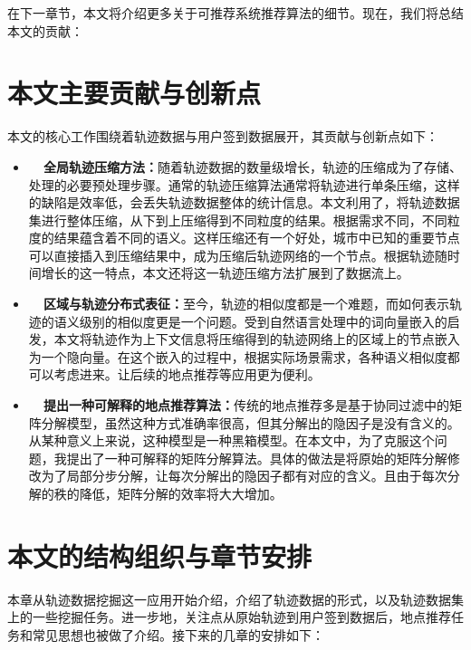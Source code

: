 在下一章节，本文将介绍更多关于可推荐系统推荐算法的细节。现在，我们将总结本文的贡献：

\section{本文主要贡献与创新点}
本文的核心工作围绕着轨迹数据与用户签到数据展开，其贡献与创新点如下：
\begin{itemize}
  \item \textbf{~~全局轨迹压缩方法：}随着轨迹数据的数量级增长，轨迹的压缩成为了存储、处理的必要预处理步骤。通常的轨迹压缩算法通常将轨迹进行单条压缩，这样的缺陷是效率低，会丢失轨迹数据整体的统计信息。本文利用了，将轨迹数据集进行整体压缩，从下到上压缩得到不同粒度的结果。根据需求不同，不同粒度的结果蕴含着不同的语义。这样压缩还有一个好处，城市中已知的重要节点可以直接插入到压缩结果中，成为压缩后轨迹网络的一个节点。根据轨迹随时间增长的这一特点，本文还将这一轨迹压缩方法扩展到了数据流上。
  \item \textbf{~~区域与轨迹分布式表征：}至今，轨迹的相似度都是一个难题，而如何表示轨迹的语义级别的相似度更是一个问题。受到自然语言处理中的词向量嵌入的启发，本文将轨迹作为上下文信息将压缩得到的轨迹网络上的区域上的节点嵌入为一个隐向量。在这个嵌入的过程中，根据实际场景需求，各种语义相似度都可以考虑进来。让后续的地点推荐等应用更为便利。
  \item \textbf{~~提出一种可解释的地点推荐算法：}传统的地点推荐多是基于协同过滤中的矩阵分解模型，虽然这种方式准确率很高，但其分解出的隐因子是没有含义的。从某种意义上来说，这种模型是一种黑箱模型。在本文中，为了克服这个问题，我提出了一种可解释的矩阵分解算法。具体的做法是将原始的矩阵分解修改为了局部分步分解，让每次分解出的隐因子都有对应的含义。且由于每次分解的秩的降低，矩阵分解的效率将大大增加。
\end{itemize}

\section{本文的结构组织与章节安排}
本章从轨迹数据挖掘这一应用开始介绍，介绍了轨迹数据的形式，以及轨迹数据集上的一些挖掘任务。进一步地，关注点从原始轨迹到用户签到数据后，地点推荐任务和常见思想也被做了介绍。接下来的几章的安排如下：

